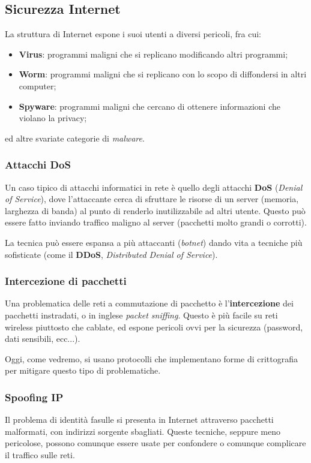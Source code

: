 \documentclass[a4paper,11pt]{article}
\begin{document}
\subsection{Sicurezza Internet}
La struttura di Internet espone i suoi utenti a diversi pericoli, fra cui:
\begin{itemize}
	\item \textbf{Virus}: programmi maligni che si replicano modificando altri programmi;
	\item \textbf{Worm}: programmi maligni che si replicano con lo scopo di diffondersi in altri computer;
	\item \textbf{Spyware}: programmi maligni che cercano di ottenere informazioni che violano la privacy;
\end{itemize}
ed altre svariate categorie di \textit{malware}.

\subsubsection{Attacchi DoS}
Un caso tipico di attacchi informatici in rete è quello degli attacchi \textbf{DoS} (\textit{Denial of Service}), dove l'attaccante cerca di sfruttare le risorse di un server (memoria, larghezza di banda) al punto di renderlo inutilizzabile ad altri utente.
Questo può essere fatto inviando traffico maligno al server (pacchetti molto grandi o corrotti).

La tecnica può essere espansa a più attaccanti (\textit{botnet}) dando vita a tecniche più sofisticate (come il \textbf{DDoS}, \textit{Distributed Denial of Service}).

\subsubsection{Intercezione di pacchetti}
Una problematica delle reti a commutazione di pacchetto è l'\textbf{intercezione} dei pacchetti instradati, o in inglese \textit{packet sniffing}.
Questo è più facile su reti wireless piuttosto che cablate, ed espone pericoli ovvi per la sicurezza (password, dati sensibili, ecc...).

Oggi, come vedremo, si usano protocolli che implementano forme di crittografia per mitigare questo tipo di problematiche.

\subsubsection{Spoofing IP}
Il problema di identità fasulle si presenta in Internet attraverso pacchetti malformati, con indirizzi sorgente sbagliati. 
Queste tecniche, seppure meno pericolose, possono comunque essere usate per confondere o comunque complicare il traffico sulle reti.
\end{document}
